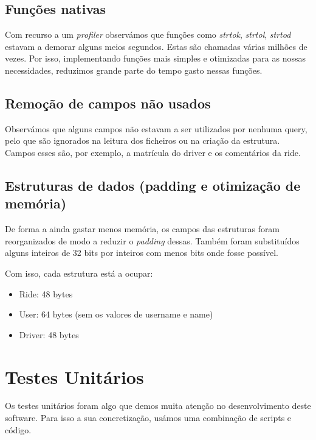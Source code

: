 \documentclass{article}
\begin{document}
        \subsection{Funções nativas}
            Com recurso a um \textit{profiler} observámos que funções como \textit{strtok}, \textit{strtol},
            \textit{strtod} estavam a demorar alguns meios segundos. Estas são chamadas várias milhões de vezes.
            Por isso, implementando funções mais simples e otimizadas para as nossas necessidades, 
            reduzimos grande parte do tempo gasto nessas funções.
        \subsection{Remoção de campos não usados}
            Observámos que alguns campos não estavam a ser utilizados por nenhuma query, 
            pelo que são ignorados na leitura dos ficheiros ou na criação da estrutura.
            Campos esses são, por exemplo, a matrícula do driver e os comentários da ride.
        \subsection{Estruturas de dados (padding e otimização de memória)}
            De forma a ainda gastar menos memória, os campos das estruturas
            foram reorganizados de modo a reduzir o \textit{padding} dessas.
            Também foram substituídos alguns inteiros de 32 bits por inteiros com menos bits
            onde fosse possível.
            
            Com isso, cada estrutura está a ocupar:
            \begin{itemize}
                \item Ride: 48 bytes
                \item User: 64 bytes (sem os valores de username e name)
                \item Driver: 48 bytes
            \end{itemize}
    \newpage     
    \section{Testes Unitários}
        Os testes unitários foram algo que demos muita atenção no desenvolvimento deste software.
        Para isso a sua concretização, usámos uma combinação de scripts e código.
        
\end{document}
